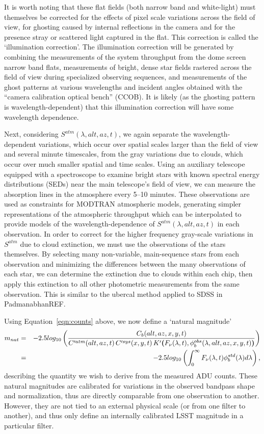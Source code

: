 \documentclass[12pt,preprint]{aastex}
\begin{document}
It is worth noting that these flat fields (both narrow band and
white-light) must themselves be corrected for the effects of pixel
scale variations across the field of view, for ghosting caused by
internal reflections in the camera and for the presence stray or
scattered light captured in the flat. This correction is called the
`illumination correction'. The illumination correction will be
generated by combining the measurements of the system throughput from
the dome screen narrow band flats, measurements of bright, dense star
fields rastered across the field of view during specialized observing
sequences, and measurements of the ghost patterns at various
wavelengths and incident angles obtained with the ``camera calibration
optical bench'' (CCOB).  It is likely (as the ghosting pattern is
wavelength-dependent) that this illumination correction will have some
wavelength dependence.

Next, considering $S^{atm}(\lambda,alt,az,t)$, we again separate the
wavelength-dependent variations, which occur over spatial scales
larger than the field of view and several minute timescales, from the
gray variations due to clouds, which occur over much smaller spatial
and time scales. Using an auxiliary telescope equipped with a
spectroscope to examine bright stars with known spectral energy
distributions (SEDs) near the main telescope's field of view, we can
measure the absorption lines in the atmosphere every 5--10
minutes. These observations are used as constraints for MODTRAN
atmospheric models, generating simpler representations of the
atmospheric throughput which can be interpolated to provide models of
the wavelength-dependence of $S^{atm}(\lambda,alt,az,t)$ in each
observation. In order to correct for the higher frequency gray-scale
variations in $S^{atm}$ due to cloud extinction, we must use the
observations of the stars themselves. By selecting many non-variable,
main-sequence stars from each observation and minimizing the
differences between the many observations of each star, we can
determine the extinction due to clouds within each chip, then apply
this extinction to all other photometric measurements from the same
observation. This is similar to the ubercal method applied to SDSS in
PadmanabhanREF.

Using Equation~\ref{eqn:counts} above, we now define a `natural magnitude'
\begin{eqnarray}
\label{eqn:defnatmags}
m_{nat}  & = &-2.5 log_{10} \left( {C_b(alt,az,x,y,t) \over 
C'^{atm}(alt,az,t) \, C'^{sys}(x,y,t) \,
K'{\textbf(}F_\nu(\lambda,t),
\phi_b^{obs}(\lambda,alt,az,x,y,t){\textbf)} } \right) \nonumber \\
 & = & -2.5 log_{10} \left( \int_0^\infty
   {F_\nu(\lambda,t)\phi_b^{std}(\lambda)  d\lambda} \right),
\end{eqnarray}
describing the quantity we wish to derive from the measured ADU counts. 
These natural magnitudes are calibrated for variations in the observed
bandpass shape and normalization, thus are directly comparable from
one observation to another. However, they are not tied to an external
physical scale (or from one filter to another), and thus only define an internally calibrated LSST
magnitude in a particular filter.
\end{document}
